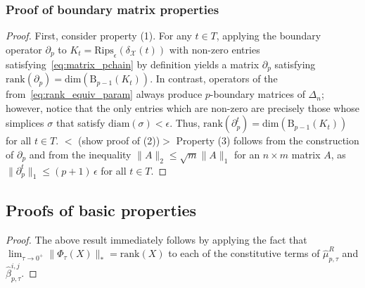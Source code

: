 \documentclass[10pt]{article}
\numberwithin{equation}{section}
\newcommand{\+}{%
	\raisebox{0.18ex}{\scaleobj{0.55}{+}}
}
\theoremstyle{definition}
\theoremstyle{definition}
\begin{document}
\subsubsection*{Proof of boundary matrix properties}
\begin{proof}
First, consider property (1). For any $t \in T$, applying the boundary operator $\partial_p$ to $K_t = \mathrm{Rips}_\epsilon(\delta_{\mathcal{X}}(t))$ with non-zero entries satisfying~\eqref{eq:matrix_pchain} by definition yields a matrix $\partial_p$ satisfying $\mathrm{rank}(\partial_p) = \mathrm{dim}(\mathrm{B}_{p-1}(K_t))$. In contrast, operators of the from~\eqref{eq:rank_equiv_param} always produce $p$-boundary matrices of $\Delta_n$; however, notice that the only entries which are non-zero are precisely those whose simplices $\sigma$ that satisfy $\mathrm{diam}(\sigma) < \epsilon$. Thus, $\mathrm{rank}(\partial_p^t) = \mathrm{dim}(\mathrm{B}_{p-1}(K_t))$ for all $t \in T$. 
$<$ (show proof of (2))$>$
Property (3) follows from the construction of $\partial_p$ and from the inequality $\lVert A \rVert_2 \leq \sqrt{m} \lVert A \rVert_1$ for an $n \times m$ matrix $A$, as $\lVert \partial_p^t \rVert_1 \leq (p+1) \, \epsilon$ for all $t \in T$.

\end{proof}

\subsection{Proofs of basic properties}
\begin{proof}
	The above result immediately follows by applying the fact that $\lim_{\tau \to 0^+} \lVert \Phi_\tau(X)\rVert_\ast = \mathrm{rank}(X)$ to each of the constitutive terms of $\hat{\mu}_{p,\tau}^R$ and $\hat{\beta}_{p,\tau}^{i,j}$.
\end{proof}
\end{document}
